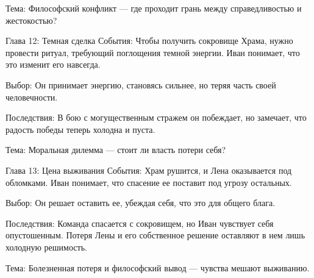 \documentclass[12pt,a4paper]{book}
\begin{document}
Тема: Философский конфликт — где проходит грань между справедливостью и жестокостью?

Глава 12: Темная сделка
События: Чтобы получить сокровище Храма, нужно провести ритуал, требующий поглощения темной энергии. Иван понимает, что это изменит его навсегда.

Выбор: Он принимает энергию, становясь сильнее, но теряя часть своей человечности.

Последствия: В бою с могущественным стражем он побеждает, но замечает, что радость победы теперь холодна и пуста.

Тема: Моральная дилемма — стоит ли власть потери себя?

Глава 13: Цена выживания
События: Храм рушится, и Лена оказывается под обломками. Иван понимает, что спасение ее поставит под угрозу остальных.

Выбор: Он решает оставить ее, убеждая себя, что это для общего блага.

Последствия: Команда спасается с сокровищем, но Иван чувствует себя опустошенным. Потеря Лены и его собственное решение оставляют в нем лишь холодную решимость.

Тема: Болезненная потеря и философский вывод — чувства мешают выживанию.
\end{document}

